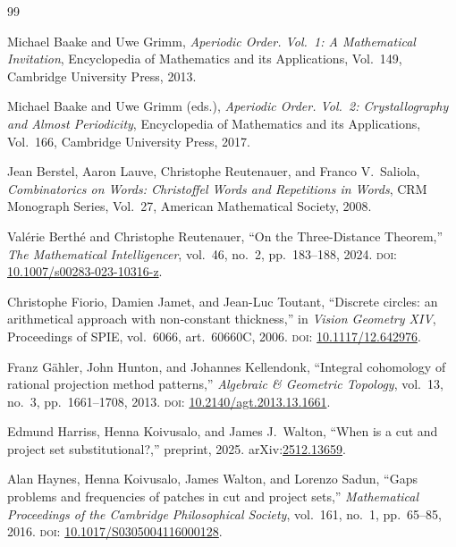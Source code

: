 \documentclass[11pt,reqno]{amsart}
\theoremstyle{plain}
\theoremstyle{definition}
\theoremstyle{remark}
\begin{document}
\sloppy
\begin{thebibliography}{99}

Michael Baake and Uwe Grimm,
\emph{Aperiodic Order. Vol.~1: A Mathematical Invitation},
Encyclopedia of Mathematics and its Applications, Vol.~149,
Cambridge University Press, 2013.

Michael Baake and Uwe Grimm (eds.),
\emph{Aperiodic Order. Vol.~2: Crystallography and Almost Periodicity},
Encyclopedia of Mathematics and its Applications, Vol.~166,
Cambridge University Press, 2017.

Jean Berstel, Aaron Lauve, Christophe Reutenauer, and Franco V.\ Saliola,
\emph{Combinatorics on Words: Christoffel Words and Repetitions in Words},
CRM Monograph Series, Vol.~27,
American Mathematical Society, 2008.

Val\'{e}rie Berth\'{e} and Christophe Reutenauer,
``On the Three-Distance Theorem,''
\emph{The Mathematical Intelligencer}, vol.~46, no.~2, pp.~183--188, 2024.
\textsc{doi}: \href{https://doi.org/10.1007/s00283-023-10316-z}%
{10.1007/s00283-023-10316-z}.

Christophe Fiorio, Damien Jamet, and Jean-Luc Toutant,
``Discrete circles: an arithmetical approach with non-constant thickness,''
in \emph{Vision Geometry XIV}, Proceedings of SPIE, vol.~6066,
art.~60660C, 2006.
\textsc{doi}: \href{https://doi.org/10.1117/12.642976}{10.1117/12.642976}.

Franz G\"ahler, John Hunton, and Johannes Kellendonk,
``Integral cohomology of rational projection method patterns,''
\emph{Algebraic \& Geometric Topology}, vol.~13, no.~3, pp.~1661--1708, 2013.
\textsc{doi}: \href{https://doi.org/10.2140/agt.2013.13.1661}%
{10.2140/agt.2013.13.1661}.

Edmund Harriss, Henna Koivusalo, and James J.\ Walton,
``When is a cut and project set substitutional?,''
preprint, 2025.
arXiv:\href{https://arxiv.org/abs/2512.13659}{2512.13659}.

Alan Haynes, Henna Koivusalo, James Walton, and Lorenzo Sadun,
``Gaps problems and frequencies of patches in cut and project sets,''
\emph{Mathematical Proceedings of the Cambridge Philosophical Society},
vol.~161, no.~1, pp.~65--85, 2016.
\textsc{doi}: \href{https://doi.org/10.1017/S0305004116000128}%
{10.1017/S0305004116000128}.


\end{thebibliography}
\end{document}
